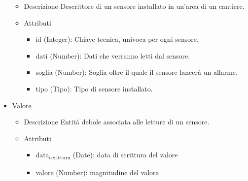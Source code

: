 \documentclass[11pt]{article}
\begin{document}
\begin{itemize}
\label{sec:org3158b9c}
\begin{itemize}
\item Descrizione
\label{sec:orga16d50c}
Descrittore di un sensore installato in un'area di un cantiere.
\item Attributi
\label{sec:org0f15afb}
\begin{itemize}
\item id (Integer): Chiave tecnica, univoca per ogni sensore.
\item dati (Number): Dati che verranno letti dal sensore.
\item soglia (Number): Soglia oltre il quale il sensore lancerá un allarme.
\item tipo (Tipo): Tipo di sensore installato.
\end{itemize}
\end{itemize}
\item Valore
\label{sec:orgf828b17}
\begin{itemize}
\item Descrizione
\label{sec:org22ec769}
Entitá debole associata alle letture di un sensore.
\item Attributi
\label{sec:org54cdd19}
\begin{itemize}
\item data\textsubscript{scrittura} (Date): data di scrittura del valore
\item valore (Number): magnitudine del valore
\end{itemize}
\end{itemize}
\end{itemize}
\end{document}
